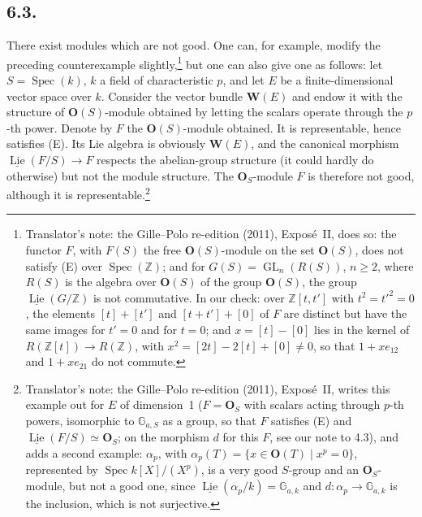 \subsection*{6.3.}
There exist modules which are not good. One can, for example, modify
the preceding counterexample slightly,\footnote{Translator's note: the
Gille--Polo re-edition (2011), Expos\'e~II, does so: the functor \(F\),
with \(F(S)\) the free \(\mathbf O(S)\)-module on the set \(\mathbf O(S)\),
does not satisfy (E) over \(\operatorname{Spec}(\mathbb Z)\); and for
\(G(S)=\operatorname{GL}_n(R(S))\), \(n\geq2\), where \(R(S)\) is the
algebra over \(\mathbf O(S)\) of the group \(\mathbf O(S)\), the group
\(\underline{\operatorname{Lie}}(G/\mathbb Z)\) is not commutative. In our
check: over \(\mathbb Z[t,t']\) with \(t^2=t'^2=0\), the elements
\([t]+[t']\) and \([t+t']+[0]\) of \(F\) are distinct but have the same
images for \(t'=0\) and for \(t=0\); and \(x=[t]-[0]\) lies in the kernel
of \(R(\mathbb Z[t])\to R(\mathbb Z)\), with
\(x^2=[2t]-2[t]+[0]\neq0\), so that \(1+xe_{12}\) and \(1+xe_{21}\) do not
commute.} but one can also give one as
follows: let \(S=\operatorname{Spec}(k)\), \(k\) a field of
characteristic \(p\), and let \(E\) be a finite-dimensional vector space
over \(k\). Consider the vector bundle \(\mathbf W(E)\) and endow it with
the structure of \(\mathbf O(S)\)-module obtained by letting the scalars
operate through the \(p\)-th power. Denote by \(F\) the
\(\mathbf O(S)\)-module obtained. It is representable, hence satisfies
(E). Its Lie algebra is obviously \(\mathbf W(E)\), and the canonical
morphism \(\underline{\operatorname{Lie}}(F/S)\to F\) respects the
abelian-group structure (it could hardly do otherwise) but not the module
structure. The \(\mathbf O_S\)-module \(F\) is therefore not good,
although it is representable.\footnote{Translator's note: the Gille--Polo
re-edition (2011), Expos\'e~II, writes this example out for \(E\) of
dimension~1 (\(F=\mathbf O_S\) with scalars acting through \(p\)-th powers,
isomorphic to \(\mathbb G_{a,S}\) as a group, so that \(F\) satisfies (E)
and \(\underline{\operatorname{Lie}}(F/S)\simeq\mathbf O_S\); on the
morphism \(d\) for this \(F\), see our note to 4.3), and adds a second
example: \(\alpha_p\), with \(\alpha_p(T)=\{x\in\mathbf O(T)\mid x^p=0\}\),
represented by \(\operatorname{Spec}k[X]/(X^p)\), is a very good
\(S\)-group and an \(\mathbf O_S\)-module, but not a good one, since
\(\underline{\operatorname{Lie}}(\alpha_p/k)=\mathbb G_{a,k}\) and
\(d\colon\alpha_p\to\mathbb G_{a,k}\) is the inclusion, which is not
surjective.}

